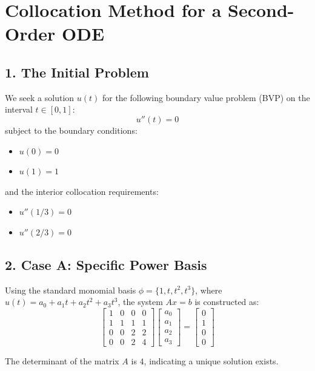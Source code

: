 \documentclass{article}
\begin{document}
\section*{Collocation Method for a Second-Order ODE}

\subsection*{1. The Initial Problem}
We seek a solution $u(t)$ for the following boundary value problem (BVP) on the interval $t \in [0, 1]$:
\begin{equation}
    u''(t) = 0
\end{equation}
subject to the boundary conditions:
\begin{itemize}
    \item $u(0) = 0$
    \item $u(1) = 1$
\end{itemize}
and the interior collocation requirements:
\begin{itemize}
    \item $u''(1/3) = 0$
    \item $u''(2/3) = 0$
\end{itemize}

\subsection*{2. Case A: Specific Power Basis}
Using the standard monomial basis $\phi = \{1, t, t^2, t^3\}$, where $u(t) = a_0 + a_1t + a_2t^2 + a_3t^3$, the system $Ax=b$ is constructed as:
\begin{equation}
\begin{bmatrix} 
1 & 0 & 0 & 0 \\
1 & 1 & 1 & 1 \\
0 & 0 & 2 & 2 \\
0 & 0 & 2 & 4
\end{bmatrix}
\begin{bmatrix} 
a_0 \\
a_1 \\
a_2 \\
a_3
\end{bmatrix} = 
\begin{bmatrix} 
0 \\
1 \\
0 \\
0
\end{bmatrix}
\end{equation}

The determinant of the matrix $A$ is $4$, indicating a unique solution exists.
\end{document}
